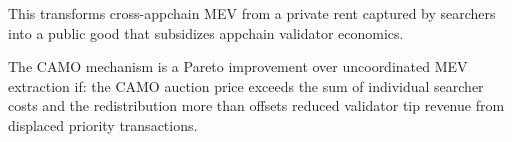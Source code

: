 This transforms cross-appchain MEV from a private rent captured by searchers into a
public good that subsidizes appchain validator economics.

\begin{proposition}
The CAMO mechanism is a Pareto improvement over uncoordinated MEV extraction if:
the CAMO auction price exceeds the sum of individual searcher costs and the redistribution
more than offsets reduced validator tip revenue from displaced priority transactions.
\end{proposition}

